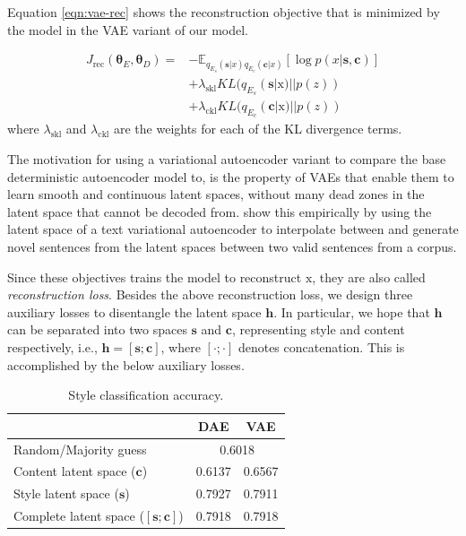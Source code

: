 \documentclass[11pt,a4paper]{article}
\newcommand{\rmx}{\mathrm x} %
\newcommand{\tabh}[1]{\multicolumn{1}{c|}{\textbf{#1}}}  %
\newcommand{\loss}[1]{J_\text{#1}}
\begin{document}
Equation \ref{eqn:vae-rec} shows the reconstruction objective that is minimized by the model in the VAE variant of our model.

\begin{align} \label{eqn:vae-rec}
	\loss{rec}(\bm\theta_E, \bm\theta_D) = \nonumber
	 & - \mathbb{E}_{q_{E_s}(\bm s|x) q_{E_c}(\bm c|x)} [\log p(x|\bm s, \bm c)] \nonumber \\
	 & + \lambda_{\text{skl}} KL(q_{E_s}(\bm s|\rmx)||p(z)) \nonumber                       \\
	 & + \lambda_{\text{ckl}} KL(q_{E_c}(\bm c|\rmx)||p(z))
\end{align}
where $\lambda_{\text{skl}}$ and $\lambda_{\text{ckl}}$ are the weights for each of the KL divergence terms.

The motivation for using a variational autoencoder variant to compare the base deterministic autoencoder model to, is the property of VAEs that enable them to learn smooth and continuous latent spaces, without many dead zones in the latent space that cannot be decoded from. \cite{bowman2016generating} show this empirically by using the latent space of a text variational autoencoder to interpolate between and generate novel sentences from the latent spaces between two valid sentences from a corpus.



Since these objectives trains the model to reconstruct $\rmx$, they are also called \textit{reconstruction loss}. Besides the above reconstruction loss, we design three auxiliary losses to disentangle the latent space $\bm h$. In particular, we hope that $\bm h$ can be separated into two spaces $\bm s$ and $\bm c$, representing style and content respectively, i.e., $\bm h = [\bm s ; \bm c]$, where $[\cdot;\cdot]$ denotes concatenation. This is accomplished by the below auxiliary losses.

\begin{table}[ht]
	\centering
	\begin{tabular}{| l | r | r |}
		\hline
		                                        & \tabh{DAE}                  & \tabh{VAE} \\
		\hline \hline
		Random/Majority guess                   & \multicolumn{2}{c|}{0.6018}              \\ \hline \hline
		Content latent space  ($\bm c$)         & 0.6137                      & 0.6567     \\ \hline
		Style latent space ($\bm s$)            & 0.7927                      & 0.7911     \\ \hline
		Complete latent space ($[\bm s;\bm c]$) & 0.7918                      & 0.7918     \\
		\hline
	\end{tabular}
	\caption{Style classification accuracy.}
	\label{tab:classification}
\end{table}
\end{document}
